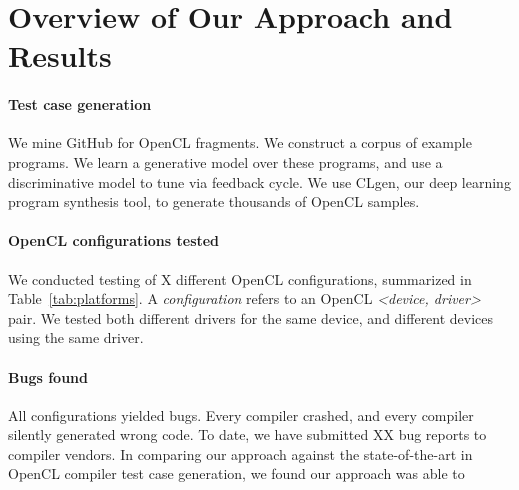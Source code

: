 \section{Overview of Our Approach and Results}\label{sec:overview}

\paragraph{Test case generation} We mine GitHub for OpenCL fragments. We construct a corpus of example programs. We learn a generative model over these programs, and use a discriminative model to tune via feedback cycle. We use CLgen, our deep learning program synthesis tool, to generate thousands of OpenCL samples.

\paragraph{OpenCL configurations tested} We conducted testing of X different OpenCL configurations, summarized in Table~\ref{tab:platforms}. A \emph{configuration} refers to an OpenCL \emph{<device, driver>} pair. We tested both different drivers for the same device, and different devices using the same driver.



\paragraph{Bugs found} All configurations yielded bugs. Every compiler crashed, and every compiler silently generated wrong code. To date, we have submitted XX bug reports to compiler vendors. In comparing our approach against the state-of-the-art in OpenCL compiler test case generation, we found our approach was able to \cc{\ldots}